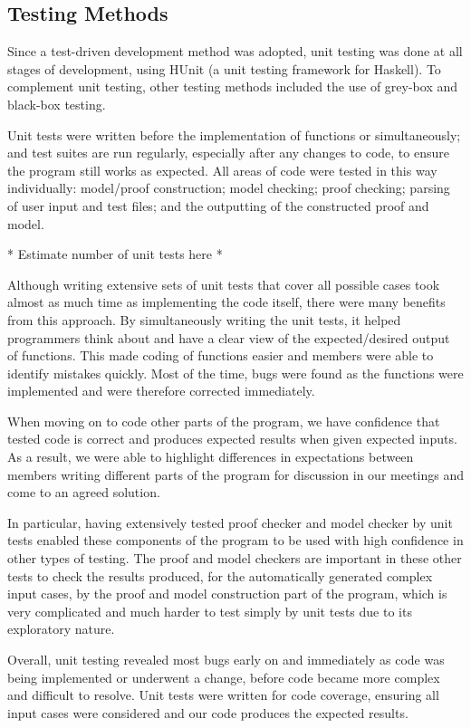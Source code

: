 \subsection*{Testing Methods}

Since a test-driven development method was adopted, unit testing was done at all stages of development, using HUnit (a unit testing framework for Haskell). To complement unit testing, other testing methods included the use of grey-box and black-box testing.

Unit tests were written before the implementation of functions or simultaneously; and test suites are run regularly, especially after any changes to code, to ensure the program still works as expected. All areas of code were tested in this way individually: model/proof construction; model checking; proof checking; parsing of user input and test files; and the outputting of the constructed proof and model.

* Estimate number of unit tests here *

Although writing extensive sets of unit tests that cover all possible cases took almost as much time as implementing the code itself, there were many benefits from this approach. By simultaneously writing the unit tests, it helped programmers think about and have a clear view of the expected/desired output of functions. This made coding of functions easier and members were able to identify mistakes quickly. Most of the time, bugs were found as the functions were implemented and were therefore corrected immediately.

When moving on to code other parts of the program, we have confidence that tested code is correct and produces expected results when given expected inputs. As a result, we were able to highlight differences in expectations between members writing different parts of the program for discussion in our meetings and come to an agreed solution.

In particular, having extensively tested proof checker and model checker by unit tests enabled these components of the program to be used with high confidence in other types of testing. The proof and model checkers are important in these other tests to check the results produced, for the automatically generated complex input cases, by the proof and model construction part of the program, which is very complicated and much harder to test simply by unit tests due to its exploratory nature.

Overall, unit testing revealed most bugs early on and immediately as code was being implemented or underwent a change, before code became more complex and difficult to resolve. Unit tests were written for code coverage, ensuring all input cases were considered and our code produces the expected results.

